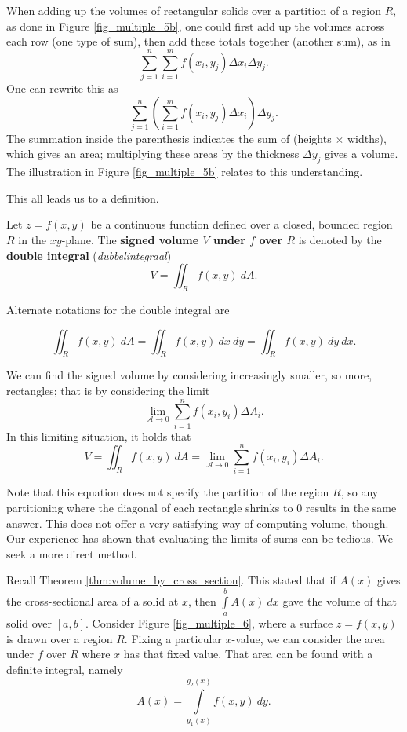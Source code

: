  When adding up the volumes of rectangular solids over a partition of a region $R$, as done in Figure \ref{fig_multiple_5b}, one could first add up the volumes across each row (one type of sum), then add these totals together (another sum), as in
$$\sum_{j=1}^n\sum_{i=1}^mf(x_i,y_j)\Delta x_i\Delta y_j.$$
One can rewrite this  as
$$\sum_{j=1}^n\left(\sum_{i=1}^mf(x_i,y_j)\Delta x_i\right)\Delta y_j.$$
The summation inside the parenthesis indicates the sum of (heights $\times$ widths), which gives an area; multiplying these areas by the thickness $\Delta y_j$ gives a volume. The illustration in Figure \ref{fig_multiple_5b} relates to this understanding.

This all leads us to a definition.

\begin{definition}\label{def:double_int}
Let $z=f(x,y)$ be a continuous function defined over a closed, bounded region $R$ in the $xy$-plane. The \textbf{signed volume $V$ under $f$ over $R$} is denoted by the \textbf{double integral} (\textit{dubbelintegraal})
$$V = \iint_R f(x,y)\ dA.$$
\end{definition}

Alternate notations for the double integral are

$$\iint_R f(x,y)\ dA=\iint_R f(x,y)\ dx\ dy=\iint_R f(x,y)\ dy\ dx.$$

We can find the signed volume by considering increasingly smaller, so more, rectangles; that is by considering the limit
$$\lim_{\mathcal{A}\to 0}\sum_{i=1}^n f(x_i,y_i)\Delta A_i.$$
In this limiting situation, it holds that 
\begin{equation}
V = \iint_R f(x,y)\ dA = \lim_{\mathcal{A}\to 0}\sum_{i=1}^n f(x_i,y_i)\Delta A_i.
\label{thm:double_int}
\end{equation}

Note that this equation does not specify the partition of the region $R$, so any partitioning where the diagonal of each rectangle shrinks to 0 results in the same answer. This does not offer a very satisfying way of computing volume, though. Our experience has shown that evaluating the limits of sums can be tedious. We seek a more direct method.

Recall Theorem \ref{thm:volume_by_cross_section}. This stated that if $A(x)$ gives the cross-sectional area of a solid at $x$, then $\int\limits_a^b A(x)\ dx$ gave the volume of that solid over $[a,b]$. Consider Figure \ref{fig_multiple_6}, where a surface $z=f(x,y)$ is drawn over a region $R$. Fixing a particular $x$-value, we can consider the area under $f$ over $R$ where $x$ has that fixed value. That area can be found with a definite integral, namely 
$$ 
A(x)=\int\limits_{g_1(x)}^{g_2(x)} f(x,y)\ dy.
$$


